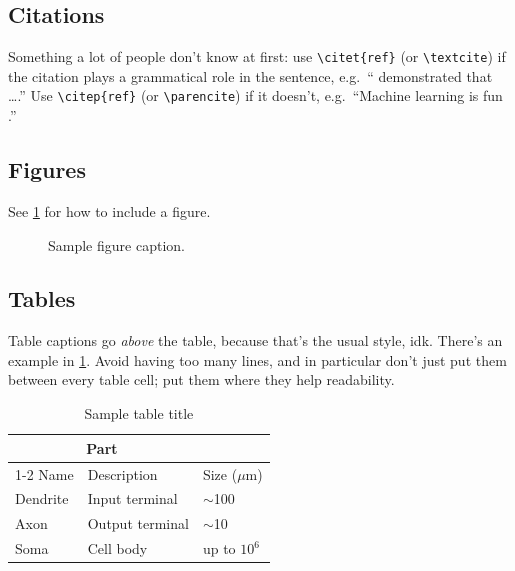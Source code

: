 \documentclass{article}
\begin{document}
\subsection{Citations}

Something a lot of people don't know at first:
use \verb+\citet{ref}+ (or \verb+\textcite+)
if the citation plays a grammatical role in the sentence,
e.g.\ ``\citet{transformers} demonstrated that \dots.''
Use \verb+\citep{ref}+ (or \verb+\parencite+)
if it doesn't, e.g.\ ``Machine learning is fun \citep{ml-is-fun}.''


\subsection{Figures}

See \cref{fig:sample} for how to include a figure.

\begin{figure}
  \centering
  \caption{Sample figure caption.}
  \label{fig:sample}
\end{figure}


\subsection{Tables}

Table captions go \emph{above} the table,
because that's the usual style, idk.
There's an example in \cref{tab:sample}.
Avoid having too many lines, and in particular don't just put them between every table cell; put them where they help readability.

\begin{table}
  \caption{Sample table title}
  \label{tab:sample}
  \centering
  \begin{tabular}{lll}
    \toprule
    \multicolumn{2}{c}{Part}                   \\
    \cmidrule(r){1-2}
    Name     & Description     & Size ($\mu$m) \\
    \midrule
    Dendrite & Input terminal  & $\sim$100     \\
    Axon     & Output terminal & $\sim$10      \\
    Soma     & Cell body       & up to $10^6$  \\
    \bottomrule
  \end{tabular}
\end{table}
\end{document}
